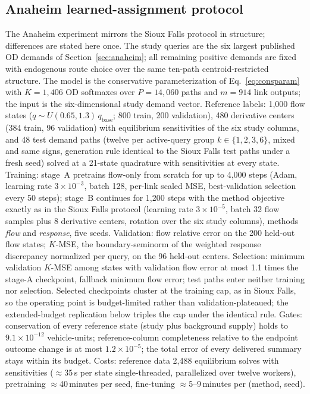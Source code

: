 \subsection{Anaheim learned-assignment protocol}\label{app:anaheimlearning}
The Anaheim experiment mirrors the Sioux Falls protocol in structure;
differences are stated here once. The study queries are the six largest
published OD demands of Section~\ref{sec:anaheim}; all remaining
positive demands are fixed with endogenous route choice over the same
ten-path centroid-restricted structure. The model is the conservative
parameterization of Eq.~\eqref{eq:consparam} with $K=1{,}406$ OD
softmaxes over $P=14{,}060$ paths and $m=914$ link outputs; the input
is the six-dimensional study demand vector. Reference labels: 1{,}000
flow states ($q\sim U(0.65,1.3)\,q_{\mathrm{base}}$; 800 train, 200
validation), 480 derivative centers (384 train, 96 validation) with
equilibrium sensitivities of the six study columns, and 48 test demand
paths (twelve per active-query group $k\in\{1,2,3,6\}$, mixed and same
signs, generation rule identical to the Sioux Falls test paths under a
fresh seed) solved at a 21-state quadrature with sensitivities at every
state. Training: stage~A pretrains flow-only from scratch for up to
4{,}000 steps (Adam, learning rate $3\times10^{-3}$, batch 128,
per-link scaled MSE, best-validation selection every 50 steps); stage~B
continues for 1{,}200 steps with the method objective exactly as in
the Sioux Falls protocol (learning rate $3\times10^{-5}$, batch 32
flow samples plus 8 derivative centers, rotation over the six study
columns), methods \emph{flow} and \emph{response}, five seeds.
Validation: flow relative error on the 200 held-out flow states;
$K$-MSE, the boundary-seminorm of the weighted response discrepancy
normalized per query, on the 96 held-out centers. Selection: minimum
validation $K$-MSE among states with validation flow error at most
1.1 times the stage-A checkpoint, fallback minimum flow error; test
paths enter neither training nor selection. Selected checkpoints
cluster at the training cap, as in Sioux Falls, so the operating
point is budget-limited rather than validation-plateaued; the
extended-budget replication below triples the cap under the identical
rule. Gates: conservation of every reference state (study plus
background supply) holds to $9.1\times10^{-12}$ vehicle-units;
reference-column completeness relative to the endpoint outcome change
is at most $1.2\times10^{-5}$; the total error of every delivered
summary stays within its budget. Costs: reference data 2{,}488
equilibrium solves with sensitivities ($\approx$35\,s per state
single-threaded, parallelized over twelve workers), pretraining
$\approx$40\,minutes per seed, fine-tuning $\approx$5--9\,minutes per
(method, seed).

